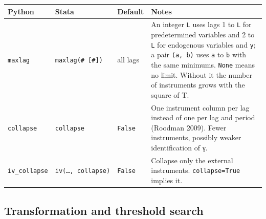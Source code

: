\documentclass[
  10.5pt,
  a4paper,
]{article}
\newcounter{none} %
\begin{document}
{\def\LTcaptype{none} %
\begin{longtable}[]{@{}
  >{\raggedright\arraybackslash}p{}
  >{\raggedright\arraybackslash}p{}
  >{\raggedright\arraybackslash}p{}
  >{\raggedright\arraybackslash}p{}@{}}
\toprule\noalign{}
\begin{minipage}[b]{\linewidth}\raggedright
Python
\end{minipage} & \begin{minipage}[b]{\linewidth}\raggedright
Stata
\end{minipage} & \begin{minipage}[b]{\linewidth}\raggedright
Default
\end{minipage} & \begin{minipage}[b]{\linewidth}\raggedright
Notes
\end{minipage} \\
\midrule\noalign{}
\endhead
\bottomrule\noalign{}
\endlastfoot
\texttt{maxlag} & \texttt{maxlag(\#\ {[}\#{]})} & all lags & An integer
\texttt{L} uses lags 1 to \texttt{L} for predetermined variables and 2
to \texttt{L} for endogenous variables and \texttt{y}; a pair
\texttt{(a,\ b)} uses \texttt{a} to \texttt{b} with the same minimums.
\texttt{None} means no limit. Without it the number of instruments grows
with the square of T. \\
\texttt{collapse} & \texttt{collapse} & \texttt{False} & One instrument
column per lag instead of one per lag and period (Roodman 2009). Fewer
instruments, possibly weaker identification of γ. \\
\texttt{iv\_collapse} & \texttt{iv(…,\ collapse)} & \texttt{False} &
Collapse only the external instruments. \texttt{collapse=True} implies
it. \\
\end{longtable}
}

\subsection{Transformation and threshold
search}\label{transformation-and-threshold-search}
\end{document}
